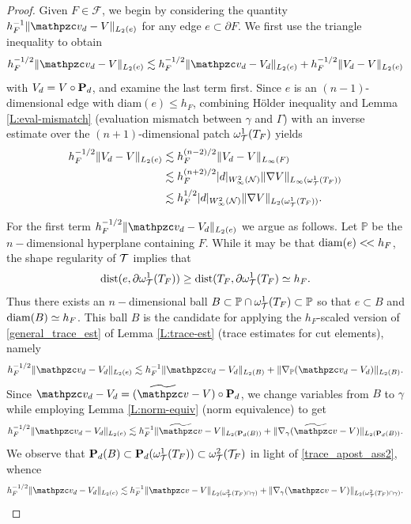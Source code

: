 \begin{proof}
Given $F \in \mathcal{F}$, we begin by considering the quantity $h_F^{-1} \|\tv_d -\tV\|_{L_2(e)}$ for any edge $e \subset \partial F$.  We first use the triangle inequality to obtain
%
\[
h_F^{-1/2} \|\tv_d- \tV\|_{L_2(e)} \lesssim h_F^{-1/2} \|\tv_d-\tV_d\|_{L_2(e)}
+ h_F^{-1/2}\|\tV_d-\tV\|_{L_2(e)} 
\]
%
with $V_d = V\circ{\bf P}_d$, 
and examine the last term first. Since $e$ is an $(n-1)$-dimensional edge with diam$(e) \le h_F$, combining H\"older inequality and Lemma \ref{L:eval-mismatch} (evaluation mismatch between $\gamma$ and $\Gamma$) with an inverse estimate over the $(n+1)$-dimensional patch $\omega_{\mathcal{T}}^1(T_F)$ yields
%
\begin{align*}
h_F^{-1/2}\|V_d-V\|_{L_2(e)} &\lesssim h_F^{(n-2)/2}\|V_d-V\|_{L_\infty(F)}
\\ &
\lesssim h_F^{(n+2)/2} |d|_{W^2_\infty(\mathcal{N})} \|\nabla V\|_{L_\infty(\omega_{\mathcal{T}}^1(T_F))}
\\&
\lesssim h_F^{1/2} |d|_{W^2_\infty(\mathcal{N})} \|\nabla V\|_{L_2(\omega_{\mathcal{T}}^1(T_F))}.
\end{align*}

For the first term $h_F^{-1/2} \|\tv_d-\tV_d\|_{L_2(e)}$ we argue as follows. Let $\mathbb{P}$ be the $n-$dimensional hyperplane containing $F$.  While it may be that ${\rm diam}(e) <\!<h_F$, the shape regularity of $\mathcal{T}$ implies that 
$${\rm dist}(e, \partial \omega_{\mathcal{T}}^1(T_F)) \ge {\rm dist}(T_F, \partial \omega_{\mathcal{T}}^1(T_F) \simeq h_F.$$  
Thus there exists an $n-$dimensional ball $B \subset \mathbb{P} \cap \omega_{\mathcal{T}}^1(T_F) \subset \mathbb{P}$ so that $e \subset B$ and ${\rm diam}(B) \simeq h_F$.  This ball $B$ is the candidate for applying the $h_F$-scaled version of \eqref{general_trace_est} of Lemma \ref{L:trace-est} (trace estimates for cut elements), namely
%
\[
h_F^{-1/2} \|\tv_d-\tV_d\|_{L_2(e)}\lesssim h_F^{-1} \|\tv_d-\tV_d\|_{L_2(B)} + \|\nabla_\mathbb{P} (\tv_d-\tV_d)\|_{L_2(B)}.
\]
%
Since $\tv_d-\tV_d = (\wv-V)\circ\bP_d$, we change variables from $B$ to $\gamma$ while employing Lemma \ref{L:norm-equiv} (norm equivalence) to get
%
\[
h_F^{-1/2} \|\tv_d-\tV_d\|_{L_2(e)}\lesssim
h_F^{-1} \|\wv-\tV\|_{L_2(\bP_d(B))} + \|\nabla_\gamma(\wv-\tV)\|_{L_2(\bP_d(B))}.
\]
%
We observe that ${\bf P}_d(B)\subset {\bf P}_d(\omega_{\mathcal{T}}^1(T_F)) \subset \omega_{\mathcal{T}}^2(\mathcal{T}_F)$ in light of \eqref{trace_apost_ass2}, whence
%
\[
h_F^{-1/2} \|\tv_d-\tV_d\|_{L_2(e)}\lesssim
h_F^{-1} \|\tv-\tV\|_{L_2(\omega_\T^2(T_F)\cap \gamma)} + \|\nabla_\gamma(\tv-\tV)\|_{L_2(\omega_\T^2(T_F) \cap \gamma)}.
\]


\end{proof}
